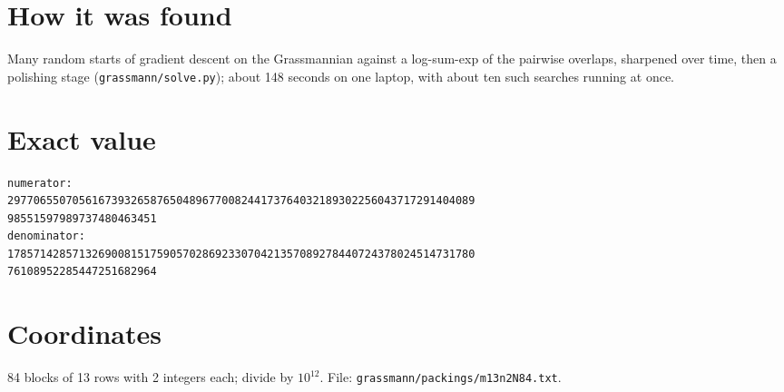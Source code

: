 \documentclass[11pt,a4paper]{article}
\begin{document}
\section{How it was found}
Many random starts of gradient descent on the Grassmannian against a log-sum-exp of the pairwise overlaps, sharpened over time, then a polishing stage (\texttt{grassmann/solve.py}); about 148 seconds on one laptop, with about ten such searches running at once.


\appendix
\section{Exact value}
{\small
\begin{verbatim}
numerator:
297706550705616739326587650489677008244173764032189302256043717291404089
98551597989737480463451
denominator:
178571428571326900815175905702869233070421357089278440724378024514731780
76108952285447251682964
\end{verbatim}}

\section{Coordinates}
84 blocks of 13 rows with 2 integers each; divide by $10^{12}$. File: \texttt{grassmann/packings/m13n2N84.txt}.
{\tiny
\begin{multicols}{4}
\end{multicols}}
\end{document}
